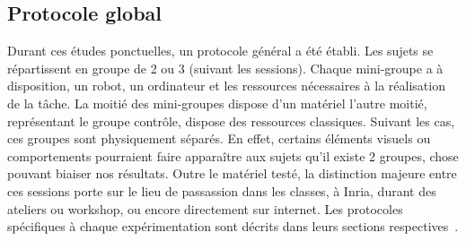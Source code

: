   \subsection{Protocole global}
    Durant ces études ponctuelles, un protocole général a été établi.
    Les sujets se répartissent en groupe de 2 ou 3 (suivant les sessions). Chaque mini-groupe a à disposition, un robot, un ordinateur et les ressources nécessaires à la réalisation de la tâche. La moitié des mini-groupes dispose d'un matériel  l'autre moitié, représentant le groupe contrôle, dispose des ressources classiques. Suivant les cas, ces groupes sont physiquement séparés. En effet, certains éléments visuels ou comportements pourraient faire apparaître aux sujets qu'il existe 2 groupes, chose pouvant biaiser nos résultats.
    Outre le matériel testé, la distinction majeure entre ces sessions porte sur le lieu de passassion \eg dans les classes, à Inria, durant des ateliers ou workshop, ou encore directement sur internet.
    Les protocoles spécifiques à chaque expérimentation sont décrits dans leurs sections respectives~.